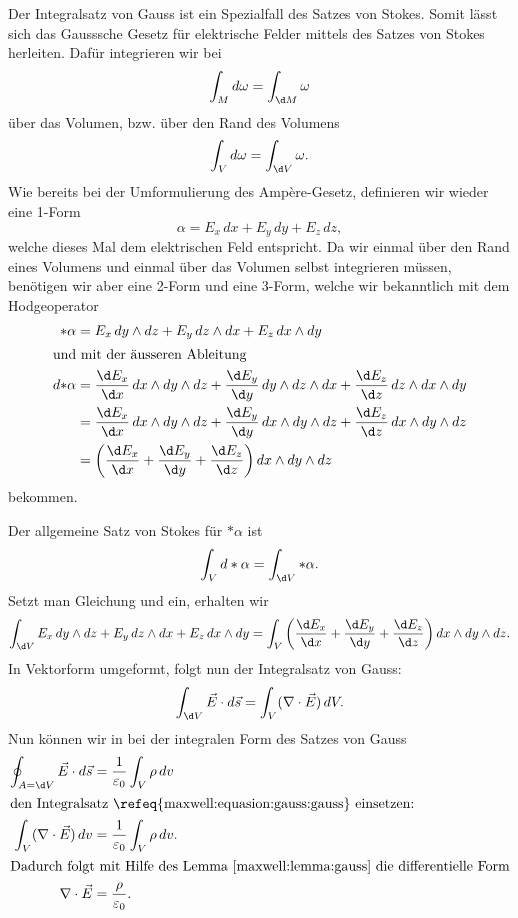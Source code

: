 Der Integralsatz von Gauss ist ein Spezialfall des Satzes von Stokes.
Somit lässt sich das Gausssche Gesetz für elektrische Felder mittels des Satzes von Stokes herleiten.
Dafür integrieren wir bei
\[
\int_{M} d\omega
=
\int_{\d M} \omega
\]
über das Volumen, bzw. über den Rand des Volumens
\[
\int_{V} d\omega
=
\int_{\d V} \omega .
\]
Wie bereits bei der Umformulierung des Ampère-Gesetz, definieren wir wieder eine 1-Form
\[
\alpha
=
E_x \, dx + E_y \, dy + E_z \, dz ,
\]
welche dieses Mal dem elektrischen Feld entspricht.
Da wir einmal über den Rand eines Volumens und einmal über das Volumen selbst integrieren müssen, benötigen wir aber eine 2-Form und eine 3-Form, welche wir bekanntlich mit dem Hodgeoperator
\begin{align}
	\ast\alpha
	&=
	E_x \, dy \wedge dz + E_y \, dz \wedge dx + E_z \, dx \wedge dy
	\label{maxwell:equasion:gauss:zweiform}
	\\
	\intertext{und mit der äusseren Ableitung}
	d{\ast}\alpha
	&=
	\frac{\d E_x}{\d x} \, dx \wedge dy \wedge dz +
	\frac{\d E_y}{\d y} \, dy \wedge dz \wedge dx +
	\frac{\d E_z}{\d z} \, dz \wedge dx \wedge dy
	\notag
	\\ 
	&=
	\frac{\d E_x}{\d x} \, dx \wedge dy \wedge dz +
	\frac{\d E_y}{\d y} \, dx \wedge dy \wedge dz +
	\frac{\d E_z}{\d z} \, dx \wedge dy \wedge dz
	\notag
	\\
	&=
	\left(
	\frac{\d E_x}{\d x} + \frac{\d E_y}{\d y} + \frac{\d E_z}{\d z}
	\right)
	dx \wedge dy \wedge dz 
	\label{maxwell:equasion:gauss:dreiform}
\end{align}
bekommen.

Der allgemeine Satz von Stokes für $\ast \alpha$ ist
\[
\int_{V} d \ast \alpha 
=
\int_{\d V} \ast \alpha .
\]
Setzt man Gleichung  und  ein, erhalten wir
\[
\int_{\d V}
E_x \, dy \wedge dz + E_y \, dz \wedge dx + E_z \, dx \wedge dy
=
\int_{V}
\left(
\frac{\d E_x}{\d x} + \frac{\d E_y}{\d y} + \frac{\d E_z}{\d z}
\right)
dx \wedge dy \wedge dz .
\]
In Vektorform umgeformt, folgt nun der Integralsatz von Gauss:
\begin{equation}
	\label{maxwell:equasion:gauss:gauss}
	\int_{\d V}
	\vec{E} \cdot d\vec{s}
	=
	\int_{V}
	(\nabla \cdot \vec{E}) \, dV .
\end{equation}
Nun können wir in bei der integralen Form des Satzes von Gauss
\begin{align*}
	\oint_{A=\d V} \vec{E} \cdot d\vec{s}
	&=
	\frac{1}{\varepsilon_0}\int_{V} \rho \, dv
	\\
	\intertext{den Integralsatz \refeq{maxwell:equasion:gauss:gauss} einsetzen:}
	\int_{V}
	(\nabla \cdot \vec{E}) \, dv
	&=
	\frac{1}{\varepsilon_0}\int_{V} \rho \, dv .
	\\
	\intertext{Dadurch folgt mit Hilfe des Lemma \ref{maxwell:lemma:gauss} die differentielle Form}
	\nabla \cdot \vec{E}
	&=
	\frac{\rho}{\varepsilon_0}.
\end{align*} 

